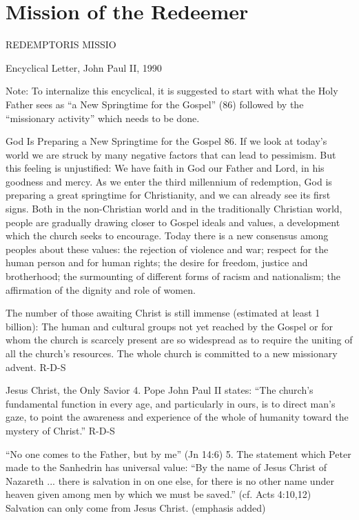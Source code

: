 \documentclass[oneside]{book}
\begin{document}

\chapter{Mission of the Redeemer}

REDEMPTORIS MISSIO

Encyclical Letter, John Paul II, 1990


Note: To internalize this encyclical, it is suggested to start with what the
Holy Father sees as ``a New Springtime for the Gospel'' (86) followed by the
``missionary activity'' which needs to be done.

God Is Preparing a New Springtime for the Gospel
86. If we look at today's world we are struck by many negative factors that can
lead to pessimism. But this feeling is unjustified: We have faith in God our
Father and Lord, in his goodness and mercy. As we enter the third millennium of
redemption, God is preparing a great springtime for Christianity, and we can
already see its first signs. Both in the non-Christian world and in the
traditionally Christian world, people are gradually drawing closer to Gospel
ideals and values, a development which the church seeks to encourage. Today
there is a new consensus among peoples about these values: the rejection of
violence and war; respect for the human person and for human rights; the desire
for freedom, justice and brotherhood; the surmounting of different forms of
racism and nationalism; the affirmation of the dignity and role of women.

The number of those awaiting Christ is still immense (estimated at least 1
billion): The human and cultural groups not yet reached by the Gospel or for
whom the church is scarcely present are so widespread as to require the uniting
of all the church's resources. The whole church is committed to a new missionary
advent.
R-D-S

Jesus Christ, the Only Savior
4. Pope John Paul II states: ``The church's fundamental function in every age,
and particularly in ours, is to direct man's gaze, to point the awareness and
experience of the whole of humanity toward the mystery of Christ.''
R-D-S

``No one comes to the Father, but by me'' (Jn 14:6)
5. The statement which Peter made to the Sanhedrin has universal value: ``By the
name of Jesus Christ of Nazareth ... there is salvation in on one else, for
there is no other name under heaven given among men by which we must be saved.''
(cf. Acts 4:10,12) Salvation can only come from Jesus Christ. (emphasis added)
\end{document}
